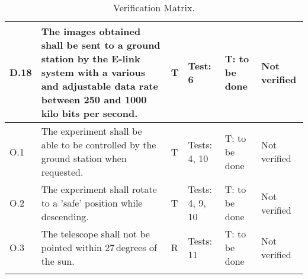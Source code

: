 \begin{longtable}[]{|m{}| m{}|m{}|m{}|m{}|m{}|}
  D.18 & The images obtained shall be sent to a ground station by the E-link system with a various and adjustable data rate between 250 and 1000 kilo bits per second.
& T & Test: 6 & T: to be done & Not verified \\\hline




O.1 & The experiment shall be able to be controlled by the ground station when requested.
& T & Tests: 4, 10 & T: to be done & Not verified \\\hline

O.2 & The experiment shall rotate to a 'safe' position while descending.
& T & Tests: 4, 9, 10 & T: to be done & Not verified \\\hline

 O.3 & The telescope shall not be pointed within 27\,degrees of the sun.
& R & Tests: 11 & T: to be done & Not verified \\\hline

\caption{Verification Matrix.}
\label{tab:var-mat}
\end{longtable}
\raggedbottom
